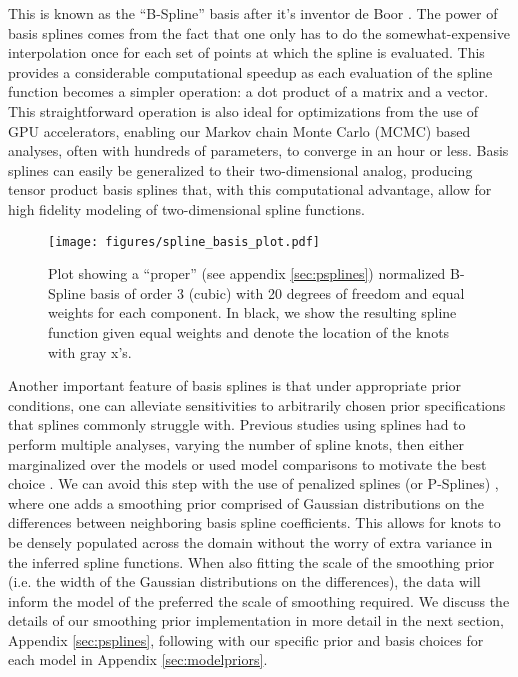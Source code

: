 \noindent This is known as the ``B-Spline'' basis after it's inventor de Boor \citep{deBoor78}. The power of basis splines
comes from the fact that one only has to do the somewhat-expensive interpolation once for each set of points at which the spline is evaluated. 
This provides a considerable computational speedup as each evaluation of the spline function becomes a simpler operation: a dot product of a 
matrix and a vector. This straightforward operation is also ideal for optimizations from the use of GPU accelerators, 
enabling our Markov chain Monte Carlo (MCMC) based analyses, often with hundreds of parameters, to converge in an hour or less. 
Basis splines can easily be generalized to their two-dimensional analog, producing tensor product basis splines that, 
with this computational advantage, allow for high fidelity modeling of two-dimensional spline functions.

\begin{figure}[ht!]
    \begin{centering}
        \texttt{[image: figures/spline\_basis\_plot.pdf]}
        \caption{Plot showing a ``proper'' (see appendix \ref{sec:psplines}) normalized B-Spline basis of order 3 (cubic) with 20 degrees of freedom and equal weights for each component. 
        In black, we show the resulting spline function given equal weights and denote the location of the knots with gray x's.}
        \label{fig:spline_basis}
    \end{centering}
\end{figure}

Another important feature of basis splines is that under appropriate prior conditions, one can alleviate sensitivities to arbitrarily 
chosen prior specifications that splines commonly struggle with. Previous studies using splines had to perform multiple analyses, varying the 
number of spline knots, then either marginalized over the models or used model comparisons to motivate the best choice \citep{Edelman_2022ApJ}. 
We can avoid this step with the use of penalized splines (or P-Splines) \citep{eilers2021practical,BayesianPSplines,Jullion2007RobustSO}, 
where one adds a smoothing prior comprised of Gaussian distributions on the differences between neighboring basis spline coefficients. 
This allows for knots to be densely populated across the domain without the worry of extra variance in the inferred spline functions. 
When also fitting the scale of the smoothing prior (i.e. the width of the Gaussian distributions on the differences), the data will inform the model 
of the preferred the scale of smoothing required. We discuss the details of our smoothing prior implementation in more detail in the next section, 
Appendix \ref{sec:psplines}, following with our specific prior and basis choices for each model in Appendix \ref{sec:modelpriors}.

